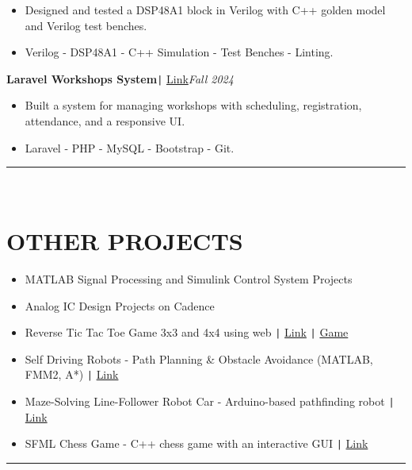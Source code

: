 \documentclass[11pt,a4paper]{article}
\begin{document}
\vspace{-0.7cm}
\begin{itemize}
\item \setlength{\itemsep}{-0.0em} Designed and tested a DSP48A1 block in Verilog with C++ golden model and Verilog test benches.
\item \setlength{\itemsep}{-0.0em} Verilog - DSP48A1 - C++ Simulation - Test Benches - Linting.
\end{itemize}
\vspace{-0.5cm}
\begin{flushleft}
\textbf{Laravel Workshops System}\texttt{|} {\href{https://github.com/salah0eldin/WorkshopsSystem}{Link}}\hfill\textit{Fall 2024}\\
\end{flushleft}
\vspace{-0.7cm}
\begin{itemize}
\item \setlength{\itemsep}{-0.0em} Built a system for managing workshops with scheduling, registration, attendance, and a responsive UI.
\item \setlength{\itemsep}{-0.0em} Laravel - PHP - MySQL - Bootstrap - Git.
\end{itemize}
\vspace{-0.5cm}
\vspace{-0.1cm}
\rule{\textwidth}{0.3pt}\\
\vspace{-0.5cm}
\centering
\section*{\fontsize{14}{18}\textbf\selectfont OTHER PROJECTS}
\vspace{-0.3cm}
\begin{itemize}[noitemsep, left=0pt, itemsep=5pt]
\item MATLAB Signal Processing and Simulink Control System Projects
\item Analog IC Design Projects on Cadence
\item Reverse Tic Tac Toe Game 3x3 and 4x4 using web \texttt{|} \href{https://github.com/salah0eldin/Tic_tac_toe_AVOID_THE_X}{Link} \texttt{|} \href{https://salah0eldin.github.io/Tic_tac_toe_AVOID_THE_X/}{Game}
\item Self Driving Robots - Path Planning \& Obstacle Avoidance (MATLAB, FMM2, A*) \texttt{|} \href{https://github.com/salah0eldin/PathPLanningUsingFMM2andAStar}{Link}
\item Maze-Solving Line-Follower Robot Car - Arduino-based pathfinding robot \texttt{|} \href{https://github.com/salah0eldin/ArduinoCarLineFollowerMazeSolver-Saver}{Link}
\item SFML Chess Game - C++ chess game with an interactive GUI \texttt{|} \href{https://github.com/salah0eldin/CHESS_CPP_SFML}{Link}
\end{itemize}
\vspace{-0.6cm}
\rule{\textwidth}{0.3pt}\\
\vspace{-0.5cm}
\centering
\end{document}
